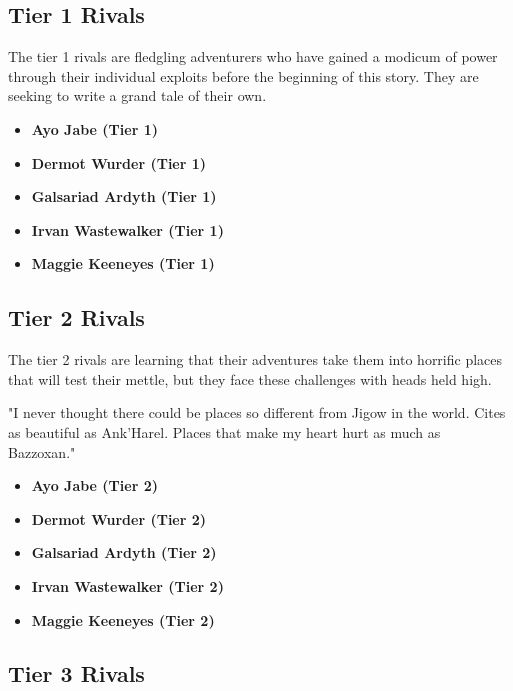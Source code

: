 \documentclass[a4paper, 11pt, bg=full, twocolumn, nooutline]{dndbook}
\begin{document}
\subsection{Tier 1 Rivals}


The tier 1 rivals are fledgling adventurers who have gained a modicum of power through their individual exploits before the beginning of this story. They are seeking to write a grand tale of their own.

\begin{itemize}
\item \textbf{Ayo Jabe (Tier 1)}
\item \textbf{Dermot Wurder (Tier 1)}
\item \textbf{Galsariad Ardyth (Tier 1)}
\item \textbf{Irvan Wastewalker (Tier 1)}
\item \textbf{Maggie Keeneyes (Tier 1)}
\end{itemize}

\subsection{Tier 2 Rivals}

The tier 2 rivals are learning that their adventures take them into horrific places that will test their mettle, but they face these challenges with heads held high.

\begin{DndReadAloud}
"I never thought there could be places so different from Jigow in the world. Cites as beautiful as Ank'Harel. Places that make my heart hurt as much as Bazzoxan."
\end{DndReadAloud}

\begin{itemize}
\item \textbf{Ayo Jabe (Tier 2)}
\item \textbf{Dermot Wurder (Tier 2)}
\item \textbf{Galsariad Ardyth (Tier 2)}
\item \textbf{Irvan Wastewalker (Tier 2)}
\item \textbf{Maggie Keeneyes (Tier 2)}
\end{itemize}

\subsection{Tier 3 Rivals}
\end{document}
